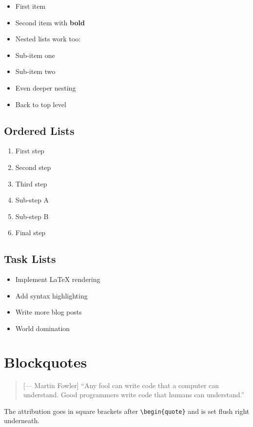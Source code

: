 \begin{itemize}
  \item First item
  \item Second item with \textbf{bold}
  \item Nested lists work too:
  \item Sub-item one
  \item Sub-item two
  \item Even deeper nesting
  \item Back to top level
\end{itemize}

\subsection{Ordered Lists}

\begin{enumerate}
  \item First step
  \item Second step
  \item Third step
  \item Sub-step A
  \item Sub-step B
  \item Final step
\end{enumerate}

\subsection{Task Lists}

\begin{itemize}
  \item Implement LaTeX rendering
  \item [x] Add syntax highlighting
  \item [ ] Write more blog posts
  \item [ ] World domination
\end{itemize}

\section{Blockquotes}

\begin{quote}[--- Martin Fowler]
``Any fool can write code that a computer can understand. Good programmers write code that humans can understand.''
\end{quote}

The attribution goes in square brackets after \texttt{\textbackslash{}begin\{quote\}} and is set flush right underneath.

